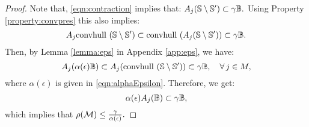 \begin{proof}Note that, \eqref{eqn:contraction} implies that:
$A_j (\mathbb{S} \setminus \mathbb{S}') \subset \gamma \mathbb{B}.$
Using Property \ref{property:convpres} this also implies:
$$A_j \mbox{convhull }(\mathbb{S} \setminus \mathbb{S}') \subset \mbox{convhull }(A_j(\mathbb{S} \setminus \mathbb{S}')) \subset \gamma \mathbb{B} .$$
Then, by Lemma \ref{lemma:eps} in Appendix \ref{app:eps}, we have:
$$A_j (\alpha(\epsilon) \mathbb{B}) \subset A_j (\mbox{convhull } (\mathbb{S} \setminus \mathbb{S}')) \subset \gamma\mathbb{B}, \quad  \forall\, j \in M,$$
where $\alpha(\epsilon)$ is given in \eqref{eqn:alphaEpsilon}. Therefore, we get:
$$\alpha(\epsilon) A_j (\mathbb{B}) \subset \gamma\mathbb{B},$$
which implies that $\rho(\mathcal{M}) \leq \frac{\gamma}{\alpha(\epsilon)}.$
\end{proof}




%
%
%
%
%

